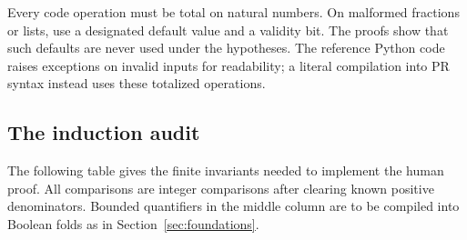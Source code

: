 Every code operation must be total on natural numbers.  On malformed
fractions or lists, use a designated default value and a validity bit.
The proofs show that such defaults are never used under the hypotheses.
The reference Python code raises exceptions on invalid inputs for
readability; a literal compilation into PR syntax instead uses these
totalized operations.

\subsection{The induction audit}

The following table gives the finite invariants needed to implement the
human proof.  All comparisons are integer comparisons after clearing
known positive denominators.  Bounded quantifiers in the middle column
are to be compiled into Boolean folds as in Section~\ref{sec:foundations}.


